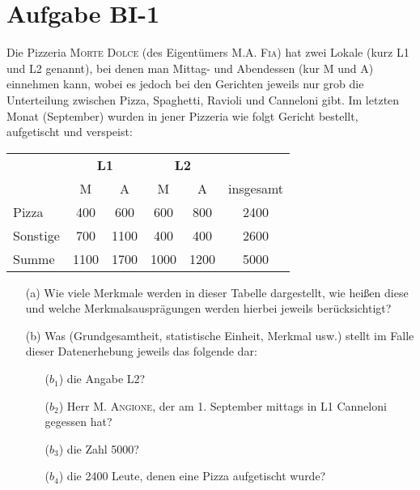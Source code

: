 
\section{Aufgabe BI-1}

\begin{task}
    Die Pizzeria \textsc{Morte Dolce} (des Eigentümers \textsc{M.A. Fia}) hat zwei Lokale (kurz L1 und L2 genannt), bei denen man Mittag- und Abendessen (kur M und A) einnehmen kann, wobei es jedoch bei den Gerichten jeweils nur grob die Unterteilung zwischen Pizza, Spaghetti, Ravioli und Canneloni gibt. Im letzten Monat (September) wurden in jener Pizzeria wie folgt Gericht bestellt, aufgetischt und verspeist:

    \begin{table}[H]
    \centering
    \begin{tabular}{l||cc|cc||c}
        \multirow{2}{*}{} & \multicolumn{2}{c|}{\bf{L1}}  & \multicolumn{2}{c||}{\bf{L2}} &                         \\
                          & \multicolumn{1}{c}{M}         & A    & \multicolumn{1}{c}{M}  & A           & insgesamt \\ \hline\hline
        Pizza             & \multicolumn{1}{c}{400}       & 600  & 600                    & 800         & 2400      \\
        Sonstige          & \multicolumn{1}{c}{700}       & 1100 & 400                    & 400         & 2600      \\
        Summe             & \multicolumn{1}{c}{1100}      & 1700 & 1000                   & 1200        & 5000     
    \end{tabular}
    \end{table}

    \begin{enumerate}
        \item[(a)] Wie viele Merkmale werden in dieser Tabelle dargestellt, wie heißen diese und welche Merkmalsausprägungen werden hierbei jeweils berücksichtigt?
    \end{enumerate}
\end{task}

\begin{task}
    \begin{enumerate}
        \item[(b)] Was (Grundgesamtheit, statistische Einheit, Merkmal usw.) stellt im Falle dieser Datenerhebung jeweils das folgende dar:
        \begin{enumerate}
            \item[($b_1$)] die Angabe L2?
            \item[($b_2$)] Herr \textsc{M. Angione}, der am 1. September mittags in L1 Canneloni gegessen hat?
            \item[($b_3$)] die Zahl 5000?
            \item[($b_4$)] die 2400 Leute, denen eine Pizza aufgetischt wurde?
        \end{enumerate}
    \end{enumerate}
\end{task}

